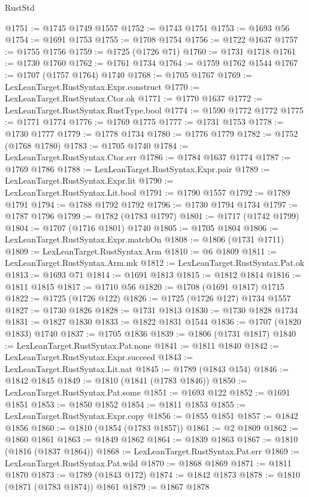 \begin{lexlean}{RustStd}
\begin{coremodule}
@1751 := @1745 @1749 @1557
@1752 := @1743 @1751
@1753 := @1693 @56
@1754 := @1691 @1753
@1755 := @1708 @1754
@1756 := @1722 @1637
@1757 := @1755 @1756
@1759 := @1725 (@1726 @71)
@1760 := @1731 @1718
@1761 := @1730 @1760
@1762 := @1761 @1734
@1764 := @1759 @1762 @1544
@1767 := @1707 (@1757 @1764) @1740
@1768 := @1705 @1767
@1769 := LexLeanTarget.RustSyntax.Expr.construct
@1770 := LexLeanTarget.RustSyntax.Ctor.ok
@1771 := @1770 @1637
@1772 := LexLeanTarget.RustSyntax.RustType.bool
@1774 := @1590 @1772 @1772
@1775 := @1771 @1774
@1776 := @1769 @1775
@1777 := @1731 @1753
@1778 := @1730 @1777
@1779 := @1778 @1734
@1780 := @1776 @1779
@1782 := @1752 (@1768 @1780)
@1783 := @1705 @1740
@1784 := LexLeanTarget.RustSyntax.Ctor.err
@1786 := @1784 @1637 @1774
@1787 := @1769 @1786
@1788 := LexLeanTarget.RustSyntax.Expr.pair
@1789 := LexLeanTarget.RustSyntax.Expr.lit
@1790 := LexLeanTarget.RustSyntax.Lit.bool
@1791 := @1790 @1557
@1792 := @1789 @1791
@1794 := @1788 @1792 @1792
@1796 := @1730 @1794 @1734
@1797 := @1787 @1796
@1799 := @1782 (@1783 @1797)
@1801 := @1717 (@1742 @1799)
@1804 := @1707 (@1716 @1801) @1740
@1805 := @1705 @1804
@1806 := LexLeanTarget.RustSyntax.Expr.matchOn
@1808 := @1806 (@1731 @1711)
@1809 := LexLeanTarget.RustSyntax.Arm
@1810 := @6 @1809
@1811 := LexLeanTarget.RustSyntax.Arm.mk
@1812 := LexLeanTarget.RustSyntax.Pat.ok
@1813 := @1693 @71
@1814 := @1691 @1813
@1815 := @1812 @1814
@1816 := @1811 @1815
@1817 := @1710 @56
@1820 := @1708 (@1691 @1817) @1715
@1822 := @1725 (@1726 @122)
@1826 := @1725 (@1726 @127) @1734 @1557
@1827 := @1730 @1826
@1828 := @1731 @1813
@1830 := @1730 @1828 @1734
@1831 := @1827 @1830
@1833 := @1822 @1831 @1544
@1836 := @1707 (@1820 @1833) @1740
@1837 := @1705 @1836
@1839 := @1806 (@1731 @1817)
@1840 := LexLeanTarget.RustSyntax.Pat.none
@1841 := @1811 @1840
@1842 := LexLeanTarget.RustSyntax.Expr.succeed
@1843 := LexLeanTarget.RustSyntax.Lit.nat
@1845 := @1789 (@1843 @154)
@1846 := @1842 @1845
@1849 := @1810 (@1841 (@1783 @1846))
@1850 := LexLeanTarget.RustSyntax.Pat.some
@1851 := @1693 @122
@1852 := @1691 @1851
@1853 := @1850 @1852
@1854 := @1811 @1853
@1855 := LexLeanTarget.RustSyntax.Expr.copy
@1856 := @1855 @1851
@1857 := @1842 @1856
@1860 := @1810 (@1854 (@1783 @1857))
@1861 := @2 @1809
@1862 := @1860 @1861
@1863 := @1849 @1862
@1864 := @1839 @1863
@1867 := @1810 (@1816 (@1837 @1864))
@1868 := LexLeanTarget.RustSyntax.Pat.err
@1869 := LexLeanTarget.RustSyntax.Pat.wild
@1870 := @1868 @1869
@1871 := @1811 @1870
@1873 := @1789 (@1843 @172)
@1874 := @1842 @1873
@1878 := @1810 (@1871 (@1783 @1874)) @1861
@1879 := @1867 @1878

\end{coremodule}
\end{lexlean}
